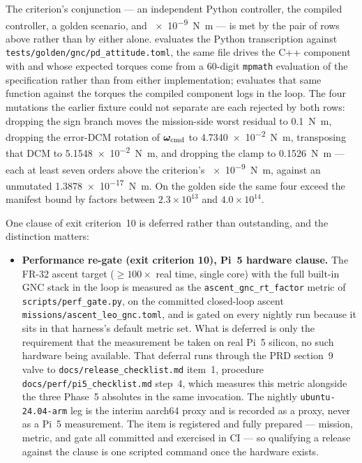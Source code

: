 The criterion's conjunction --- an independent Python controller, the
compiled controller, a golden scenario, and \qty{e-9}{\newton\metre} --- is
met by the pair of rows above rather than by either alone.
 evaluates the Python
transcription against \texttt{tests/golden/gnc/pd\_attitude.toml}, the same
file  drives the C++ component with and
whose expected torques come from a 60-digit \texttt{mpmath} evaluation of
the specification rather than from either implementation;
 evaluates that same
function against the torques the compiled component logs in the loop. The
four mutations the earlier fixture could not separate are each rejected by
both rows: dropping the sign branch moves the mission-side worst residual
to \qty{0.1}{\newton\metre}, dropping the error-DCM rotation of
$\bm{\omega}_{\mathrm{cmd}}$ to \qty{4.7340e-2}{\newton\metre}, transposing
that DCM to \qty{5.1548e-2}{\newton\metre}, and dropping the clamp to
\qty{0.1526}{\newton\metre} --- each at least seven orders above the
criterion's \qty{e-9}{\newton\metre}, against an unmutated
\qty{1.3878e-17}{\newton\metre}. On the golden side the same four exceed
the manifest bound by factors between $2.3\times10^{13}$ and
$4.0\times10^{14}$.

One clause of exit criterion~10 is deferred rather than outstanding, and
the distinction matters:
\begin{itemize}
  \item \textbf{Performance re-gate (exit criterion 10), Pi~5 hardware
    clause.} The FR-32 ascent target ($\ge 100\times$ real time, single
    core) with the full built-in GNC stack in the loop is measured as the
    \texttt{ascent\_gnc\_rt\_factor} metric of
    \texttt{scripts/perf\_gate.py}, on the committed closed-loop ascent
    \texttt{missions/ascent\_leo\_gnc.toml}, and is gated on every nightly
    run because it sits in that harness's default metric set. What is
    deferred is only the requirement that the measurement be taken on real
    Pi~5 silicon, no such hardware being available. That deferral runs
    through the PRD section~9 valve to \texttt{docs/release\_checklist.md}
    item~1, procedure \texttt{docs/perf/pi5\_checklist.md} step~4, which
    measures this metric alongside the three Phase~5 absolutes in the same
    invocation. The nightly \texttt{ubuntu-24.04-arm} leg is the interim
    aarch64 proxy and is recorded as a proxy, never as a Pi~5 measurement.
    The item is registered and fully prepared --- mission, metric, and gate
    all committed and exercised in CI --- so qualifying a release against
    the clause is one scripted command once the hardware exists.
\end{itemize}

